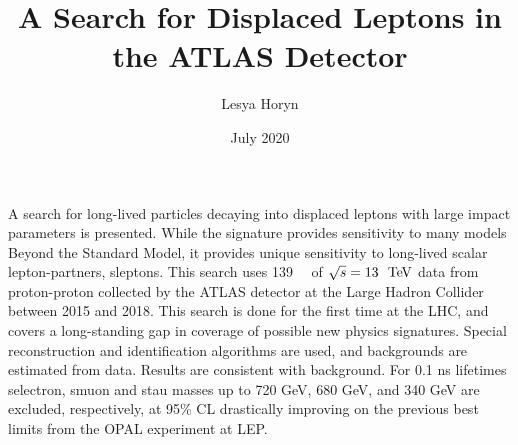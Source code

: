 \documentclass{ucetd}
\title{A Search for Displaced Leptons in the ATLAS Detector}
\author{Lesya Horyn}
\date{July 2020}
\begin{document}
\maketitle

\makecopyright

\clearpage
\begin{center}
    \thispagestyle{empty}
    \vspace*{\fill}

    \vspace*{\fill}
\end{center}
\clearpage




\tableofcontents
\listoffigures
\listoftables



\acknowledgments

\abstract
A search for long-lived particles decaying into displaced leptons with large impact parameters is presented. While the signature provides sensitivity to many models Beyond the Standard Model, it provides unique sensitivity to long-lived scalar lepton-partners, sleptons. This search uses 139~\ifb~ of $\sqrt{s} = 13~\TeV$ data from proton-proton collected by the ATLAS detector at the Large Hadron Collider between 2015 and 2018. This search is done for the first time at the LHC, and covers a long-standing gap in coverage of possible new physics signatures. Special reconstruction and identification algorithms are used, and backgrounds are estimated from data. Results are consistent with background. For 0.1 ns lifetimes selectron, smuon and stau masses up to 720 GeV, 680 GeV, and 340 GeV are excluded, respectively, at 95\% CL drastically improving on the previous best limits from the OPAL experiment at LEP.


\mainmatter



\end{document}
